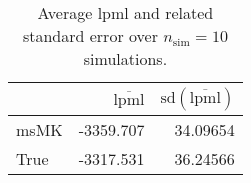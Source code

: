 \begin{table}[H]

\caption{Average lpml and related standard error over $n_{\text{sim}} = 10$ simulations.}
\centering
\begin{tabular}[t]{lrr}
\toprule
  & $\overbar{\text{lpml}}$ & $\text{sd}(\overbar{\text{lpml}})$\\
\midrule
msMK & -3359.707 & 34.09654\\
True & -3317.531 & 36.24566\\
\bottomrule
\end{tabular}
\end{table}
